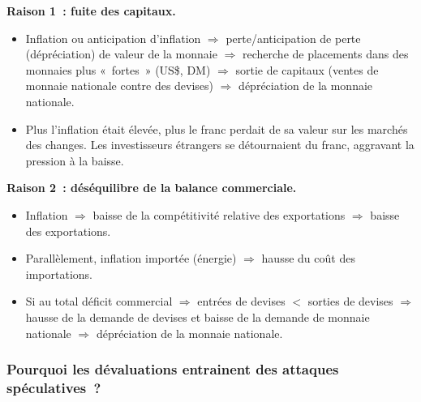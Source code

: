 \textbf{Raison 1~: fuite des capitaux.}
\begin{itemize}
  \item Inflation ou anticipation d'inflation $\Rightarrow$ perte/anticipation de perte
    (dépréciation) de valeur de la monnaie $\Rightarrow$ recherche de placements dans
    des monnaies plus «~fortes~» (US\$, DM) $\Rightarrow$ sortie de capitaux (ventes de
    monnaie nationale contre des devises) $\Rightarrow$ dépréciation de la monnaie
    nationale.
  \item Plus l'inflation était élevée, plus le franc perdait de sa valeur sur les
    marchés des changes. Les investisseurs étrangers se détournaient du franc, aggravant
    la pression à la baisse.
\end{itemize}

\textbf{Raison 2~: déséquilibre de la balance commerciale.}
\begin{itemize}
  \item Inflation $\Rightarrow$ baisse de la compétitivité relative des exportations
    $\Rightarrow$ baisse des exportations.
  \item Parallèlement, inflation importée (énergie) $\Rightarrow$ hausse du coût des
    importations.
  \item Si au total déficit commercial $\Rightarrow$ entrées de devises $<$ sorties de
    devises $\Rightarrow$ hausse de la demande de devises et baisse de la demande de
    monnaie nationale $\Rightarrow$ dépréciation de la monnaie nationale.
\end{itemize}

\subsubsection{Pourquoi les dévaluations entrainent des attaques spéculatives~?}

